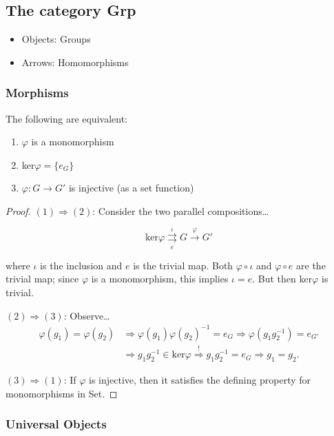 \subsection{The category Grp}
\begin{itemize}
  \item Objects: Groups
  \item Arrows: Homomorphisms
\end{itemize}

\subsubsection{Morphisms}

\begin{proposition}
The following are equivalent:
\begin{enumerate}
  \item $\varphi$ is a monomorphism
  \item ker$\varphi = \{ e_G \}$
  \item $\varphi : G \rightarrow G'$ is injective (as a set function)
\end{enumerate}
\end{proposition}

\begin{proof}
$(1) \Rightarrow (2)$: Consider the two parallel compositions\dots

$$\textrm{ker}\varphi \underset{e}{\overset{\iota}{\rightrightarrows}} G \xrightarrow[]{\varphi} G'$$

where $\iota$ is the inclusion and $e$ is the trivial map. Both $\varphi \circ \iota$ and $\varphi \circ e$ are the trivial map;
since $\varphi$ is a monomorphism, this implies $\iota = e$. But then ker$\varphi$ is trivial. 

\noindent $(2) \Rightarrow (3)$: Observe\dots
\begin{align*}
\varphi(g_1) = \varphi(g_2) &\Rightarrow \varphi(g_1)\varphi(g_2)^{-1} = e_G \Rightarrow \varphi(g_1g_2^{-1}) = e_{G'}\\
						    &\Rightarrow g_1g_2^{-1} \in \textrm{ker}\varphi \overset{!}{\Rightarrow} g_1g_2^{-1} = e_G \Rightarrow g_1 = g_2.
\end{align*}

\noindent $(3) \Rightarrow (1)$: If $\varphi$ is injective, then it satisfies the defining property for monomorphisms in Set.
\end{proof}

\subsubsection{Universal Objects}

